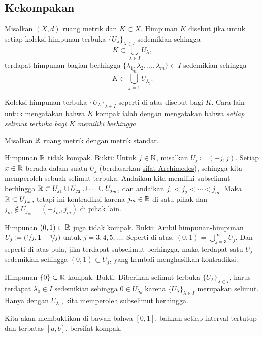 \subsection{Kekompakan}

\begin{defn}
Misalkan $(X,d)$ ruang metrik dan $K \subset X$. 
Himpunan $K$ disebut \emph{}
jika untuk setiap koleksi
himpunan terbuka $\{ U_{\lambda} \}_{\lambda \in I}$ sedemikian sehingga
\begin{equation*}
K \subset \bigcup_{\lambda \in I} U_\lambda ,
\end{equation*}
terdapat himpunan bagian berhingga
$\{ \lambda_1, \lambda_2,\ldots,\lambda_m \} \subset I$
sedemikian sehingga
\begin{equation*}
K \subset \bigcup_{j=1}^m U_{\lambda_j} .
\end{equation*}
\end{defn}

Koleksi himpunan terbuka $\{ U_{\lambda} \}_{\lambda \in I}$ seperti di atas
disebut \emph{} bagi $K$.  Cara lain untuk mengatakan bahwa
$K$ kompak ialah dengan mengatakan bahwa \emph{setiap selimut terbuka bagi $K$ memiliki
 berhingga}.

\begin{example}
Misalkan ${\mathbb{R}}$ ruang metrik dengan metrik standar.

Himpunan ${\mathbb{R}}$ tidak kompak.  Bukti: Untuk $j \in {\mathbb{N}}$, misalkan $U_j \coloneqq (-j,j)$.
Setiap $x \in {\mathbb{R}}$ berada dalam suatu $U_j$ (berdasarkan
\hyperref[thm:arch:i]{sifat Archimedes}), sehingga kita memperoleh sebuah selimut terbuka.
Andaikan kita memiliki
subselimut berhingga ${\mathbb{R}} \subset U_{j_1} \cup U_{j_2} \cup \cdots \cup U_{j_m}$,
dan andaikan $j_1 < j_2 < \cdots < j_m$.  Maka ${\mathbb{R}} \subset U_{j_m}$, tetapi ini
kontradiksi karena $j_m \in {\mathbb{R}}$ di satu pihak dan $j_m \notin U_{j_m} =
(-j_m,j_m)$ di pihak
lain.

Himpunan $(0,1) \subset {\mathbb{R}}$ juga tidak kompak.  Bukti:  Ambil 
himpunan-himpunan $U_{j} \coloneqq (\nicefrac{1}{j},1-\nicefrac{1}{j})$ untuk $j=3,4,5,\ldots$.
Seperti di atas, $(0,1) = \bigcup_{j=3}^\infty U_j$.  Dan seperti di atas pula,
jika terdapat subselimut berhingga, maka terdapat satu $U_j$ sedemikian sehingga $(0,1)
\subset U_j$, yang kembali menghasilkan kontradiksi.

Himpunan $\{ 0 \} \subset {\mathbb{R}}$ kompak.  Bukti: Diberikan selimut terbuka $\{
U_{\lambda} \}_{\lambda \in I}$, harus terdapat $\lambda_0 \in I$ sedemikian sehingga $0
\in U_{\lambda_0}$
karena $\{ U_{\lambda} \}_{\lambda \in I}$ merupakan selimut.
Hanya dengan $U_{\lambda_0}$, kita memperoleh
subselimut berhingga.

Kita akan membuktikan di bawah bahwa $[0,1]$, bahkan setiap interval tertutup
dan terbatas $[a,b]$, bersifat kompak.
\end{example}

